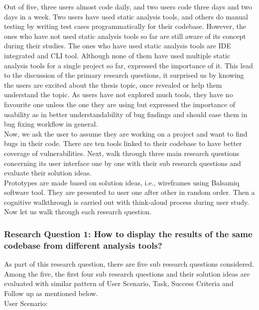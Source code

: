 Out of five, three users almost code daily, and two users code three days and two days in a week. Two users have used static analysis tools, and others do manual testing by writing test cases programmatically for their codebase. However, the ones who have not used static analysis tools so far are still aware of its concept during their studies.  The ones who have used static analysis tools are IDE integrated and CLI tool. Although none of them have used multiple static analysis tools for a single project so far, expressed the importance of it. This lead to the discussion of the primary research questions, it surprised us by knowing the users are excited about the thesis topic, once revealed or help them understand the topic. As users have not explored much tools, they have no favourite one unless the one they are using but expressed the importance of usability as in better understandability of bug findings and should ease them in bug fixing workflow in general. \\

Now, we ask the user to assume they are working on a project and want to find bugs in their code. There are ten tools linked to their codebase to have better coverage of vulnerabilities. Next, walk through three main research questions concerning its user interface one by one with their sub research questions and evaluate their solution ideas. \\

Prototypes are made based on solution ideas, i.e., wireframes using Balsamiq software tool. They are presented to user one after other in random order. Then a cognitive walkthrough is carried out with think-aloud process during user study. \\

Now let us walk through each research question. 

\subsubsection{Research Question 1: How to display the results of the same codebase from different analysis tools?}

As part of this research question, there are five sub research questions considered. Among the five, the first four sub research questions and their solution ideas are evaluated with similar pattern of User Scenario, Task, Success Criteria and Follow up as mentioned below. \\

User Scenario: \\

